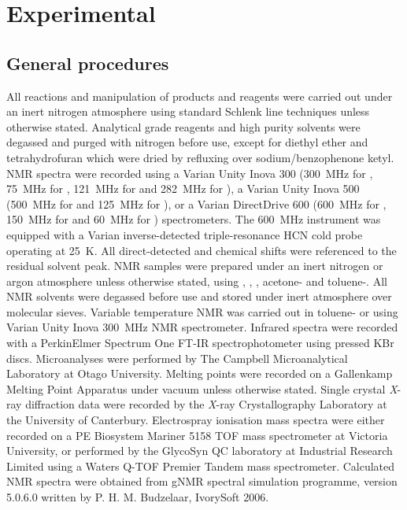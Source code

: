 
\chapter{Experimental}
\label{ch:expt}

\section{General procedures}
\label{section:generalprocedures}


All reactions and manipulation of products and reagents were carried out under an inert nitrogen atmosphere using standard Schlenk line techniques unless otherwise stated.  Analytical grade reagents and high purity solvents were degassed and purged with nitrogen before use, except for diethyl ether and tetrahydrofuran which were dried by refluxing over sodium/benzophenone ketyl.  NMR spectra were recorded using a Varian Unity Inova 300 (300~MHz for \proton, 75~MHz for \carbon, 121~MHz for \phosphorus{} and 282~MHz for \fluorine), a Varian Unity Inova 500 (500~MHz for \proton{} and 125~MHz for \carbon), or a Varian DirectDrive 600 (600~MHz for \proton, 150~MHz for \carbon{} and 60~MHz for \nitrogen) spectrometers.  The 600~MHz instrument was equipped with a Varian inverse-detected triple-resonance HCN cold probe operating at 25~K.  All direct-detected \proton{} and \carbon{} chemical shifts were referenced to the residual solvent peak.\cite{Fulmer2010}  NMR samples were prepared under an inert nitrogen or argon atmosphere unless otherwise stated, using , , , acetone- and toluene-.  All NMR solvents were degassed before use and stored under inert atmosphere over molecular sieves.  Variable temperature NMR was carried out in toluene- or  using Varian Unity Inova 300~MHz NMR spectrometer.  Infrared spectra were recorded with a PerkinElmer Spectrum One FT-IR spectrophotometer using pressed KBr discs.  Microanalyses were performed by The Campbell Microanalytical Laboratory at Otago University.  Melting points were recorded on a Gallenkamp Melting Point Apparatus under vacuum unless otherwise stated. Single crystal \textit{X}-ray diffraction data were recorded by the \textit{X}-ray Crystallography Laboratory at the University of Canterbury.  Electrospray ionisation mass spectra were either recorded on a PE Biosystem Mariner 5158 TOF mass spectrometer at Victoria University, or performed by the GlycoSyn QC laboratory at Industrial Research Limited using a Waters Q-TOF Premier Tandem mass spectrometer.  Calculated \proton{} NMR spectra were obtained from gNMR spectral simulation programme, version 5.0.6.0 written by P. H. M. Budzelaar, IvorySoft 2006.

